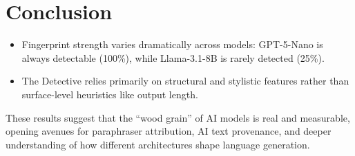 \documentclass[sigconf,nonacm]{acmart}
\begin{document}
\section{Conclusion}

\begin{itemize}
    \item Fingerprint strength varies dramatically across models: GPT-5-Nano is always detectable (100\%), while Llama-3.1-8B is rarely detected (25\%).
    \item The Detective relies primarily on structural and stylistic features rather than surface-level heuristics like output length.
\end{itemize}

These results suggest that the ``wood grain'' of AI models is real and measurable, opening avenues for paraphraser attribution, AI text provenance, and deeper understanding of how different architectures shape language generation.
\end{document}
